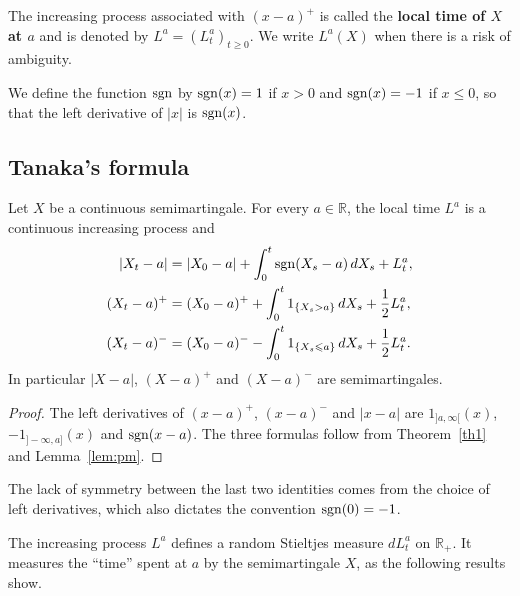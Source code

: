 \begin{definition}\label{def:localtime}
	The increasing process associated with $(x-a)^+$ is called the
	\textbf{local time of $X$ at $a$} and is denoted by $L^a = (L^a_t)_{t\geqslant 0}$.
	We write $L^a(X)$ when there is a risk of ambiguity.
\end{definition}

We define the function $\operatorname{sgn}$ by $\operatorname{sgn}(x)=1$ if $x>0$ and $\operatorname{sgn}(x)=-1$ if
$x\leqslant 0$, so that the left derivative of $|x|$ is $\operatorname{sgn}(x)$.

\subsection{Tanaka's formula}

\begin{theorem}\label{th:tanaka}
	Let $X$ be a continuous semimartingale. For every $a\in\mathbb{R}$, the
	local time $L^a$ is a continuous increasing process and
	\begin{align*}
		|X_t - a|      & =|X_0 - a| + \int_0^t \operatorname{sgn}( X_s - a)\,dX_s + L_t^a,                                \\
		(X_t - a)^{+} & =(X_0 - a)^{+}+ \int_0^t 1_{\{X_s > a\}}\, dX_s + \frac{1}{2} L_t^a,        \\
		(X_t - a)^{-} & =(X_0 - a)^{-}- \int_0^t 1_{\{X_s \leqslant a\}}\, dX_s + \frac{1}{2} L_t^a.
	\end{align*}
	In particular $|X-a|$, $(X-a)^+$ and $(X-a)^-$ are semimartingales.
\end{theorem}

\begin{proof}
	The left derivatives of $(x-a)^+$, $(x-a)^-$ and $|x-a|$ are
	$1_{]a,\infty[}(x)$, $-1_{]-\infty,a]}(x)$ and $\operatorname{sgn}(x-a)$. The three
	formulas follow from Theorem~\ref{th1} and Lemma~\ref{lem:pm}.
\end{proof}

\begin{remark}
	The lack of symmetry between the last two identities comes from the
	choice of left derivatives, which also dictates the convention
	$\operatorname{sgn}(0) = -1$.
\end{remark}

\begin{remark}
	The increasing process $L^a$ defines a random Stieltjes measure
	$dL_t^a$ on $\mathbb{R}_+$. It measures the ``time'' spent at $a$ by the
	semimartingale $X$, as the following results show.
\end{remark}

